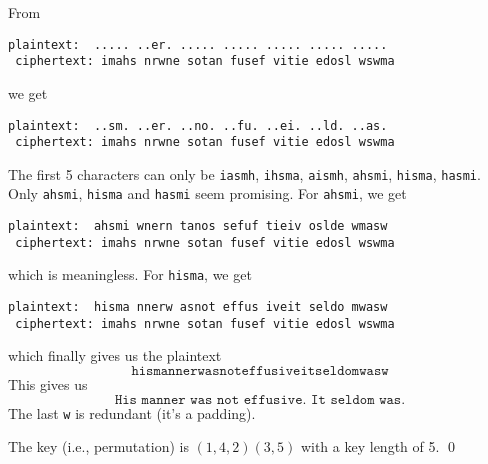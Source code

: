 \begin{itemize}
\li From
  \begin{Verbatim}[commandchars=\\\{\}]
 plaintext:  ..... ..er. ..... ..... ..... ..... .....
 ciphertext: imahs nrwne sotan fusef vitie edosl wswma
\end{Verbatim}
we get
  \begin{Verbatim}[commandchars=\\\{\}]
 plaintext:  ..sm. ..er. ..no. ..fu. ..ei. ..ld. ..as.
 ciphertext: imahs nrwne sotan fusef vitie edosl wswma
\end{Verbatim}
The first 5 characters can only be
\verb!iasmh!,
\verb!ihsma!,
\verb!aismh!,
\verb!ahsmi!,
\verb!hisma!,
\verb!hasmi!.
Only
\verb!ahsmi!,
\verb!hisma!
and
\verb!hasmi!
seem promising.
For \verb!ahsmi!, we get
  \begin{Verbatim}[commandchars=\\\{\}]
 plaintext:  ahsmi wnern tanos sefuf tieiv oslde wmasw
 ciphertext: imahs nrwne sotan fusef vitie edosl wswma
\end{Verbatim}
which is meaningless.
For \verb!hisma!, we get
  \begin{Verbatim}[commandchars=\\\{\}]
 plaintext:  hisma nnerw asnot effus iveit seldo mwasw
 ciphertext: imahs nrwne sotan fusef vitie edosl wswma
 \end{Verbatim}
 which finally gives us the plaintext
 \[
   \texttt{hismannerwasnoteffusiveitseldomwasw}
 \]
 This gives us
 \[
    \texttt{His manner was not effusive.\ It seldom was.}
 \]
 The last \verb!w! is redundant (it's a padding).
 \end{itemize}

 The key (i.e., permutation) is
 $(1,4,2)(3,5)$ with a key length of 5.
 \qed

\begin{comment}
plainttext: His manner was not effusive. It seldom was.
key = (1, 4, 2)(3, 5)

hisma - imahs
nnerw - nrwne
asnot - sotan
effus - fusef
iveit - vitie
seldo - edosl
mwasw - wswma
\end{comment}









